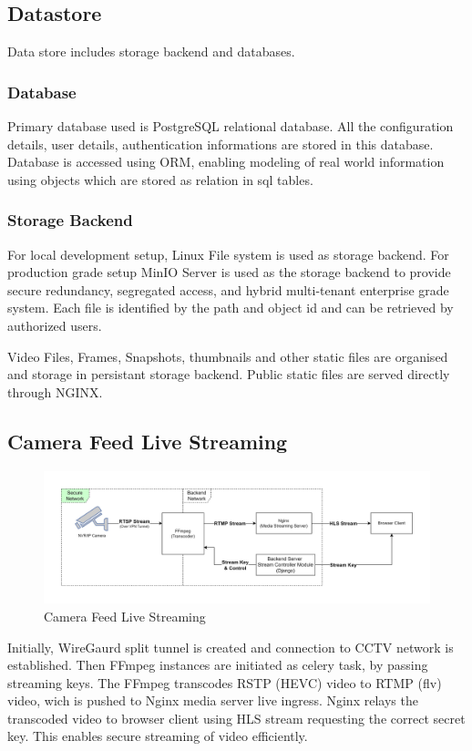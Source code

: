 \subsection{Datastore}
Data store includes storage backend and databases. 

	\subsubsection{Database}
	Primary database used is PostgreSQL relational database. All the configuration details, user details, authentication informations are stored in this database. Database is accessed using ORM, enabling modeling of real world information using objects which are stored as relation in sql tables.

	\subsubsection{Storage Backend}
	For local development setup, Linux File system is used as storage backend. For production grade setup MinIO Server is used as the storage backend to provide secure redundancy, segregated access, and hybrid multi-tenant enterprise grade system. Each file is identified by the path and object id and can be retrieved by authorized users. 

	Video Files, Frames, Snapshots, thumbnails and other static files are organised and storage in persistant storage backend. Public static files are served directly through NGINX.


\subsection{Camera Feed Live Streaming}
\begin{figure}[ht!]
	\centering
	\includegraphics[width=0.8\linewidth]{Images/live_stream_arch}
	\caption{Camera Feed Live Streaming}
	\label{fig:livestreamarch}
\end{figure}
Initially, WireGaurd split tunnel is created and connection to CCTV network is established. Then FFmpeg instances are initiated as celery task, by passing streaming keys. The FFmpeg transcodes RSTP (HEVC) video to RTMP (flv) video, wich is pushed to Nginx media server live ingress. Nginx relays the transcoded video to browser client using HLS stream requesting the correct secret key. This enables secure streaming of video efficiently.

